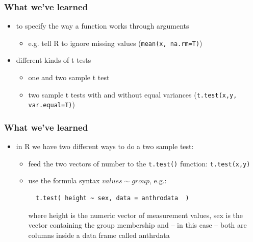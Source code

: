 \documentclass[xcolor={table}]{beamer}
\begin{document}
\begin{frame}\frametitle{What we've learned}
  \begin{itemize}
  \item to specify the way a function works through arguments
    \begin{itemize}
    \item e.g. tell R to ignore missing values (\texttt{mean(x, na.rm=T)})
    \end{itemize}
  \item different kinds of t tests
    \begin{itemize}
    \item one and two sample t test
    \item two sample t tests with and without equal variances (\texttt{t.test(x,y, var.equal=T)})
    \end{itemize}
  \end{itemize}
\end{frame}

\begin{frame}[fragile]\frametitle{What we've learned}
  \begin{itemize}
  \item in R we have two different ways to do a two sample test:
    \begin{itemize}
    \item feed the two vectors of number to the \texttt{t.test()} function: \texttt{t.test(x,y)}
    \item use the formula syntax $values \sim group$, e.g.: 
\begin{verbatim}
  t.test( height ~ sex, data = anthrodata  )
\end{verbatim}
where height is the numeric vector of measurement values, sex is the vector containing the group membership and -- in this case -- both are columns inside a data frame called anthrdata
    \end{itemize}
  \end{itemize}
\end{frame}
\end{document}
